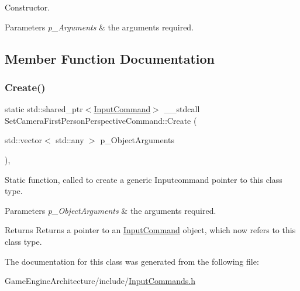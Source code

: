 Constructor. 


\begin{DoxyParams}{Parameters}
{\em p\+\_\+\+Arguments} & the arguments required. \\
\hline
\end{DoxyParams}


\subsection{Member Function Documentation}
\mbox{\label{class_set_camera_first_person_perspective_command_aa8b50b18b466a0577410cd19c87abd23}} 
\subsubsection{\texorpdfstring{Create()}{Create()}}
{\footnotesize\ttfamily static std\+::shared\+\_\+ptr$<$\mbox{\hyperlink{class_input_command}{Input\+Command}}$>$ \+\_\+\+\_\+stdcall Set\+Camera\+First\+Person\+Perspective\+Command\+::\+Create (\begin{DoxyParamCaption}\item[{std\+::vector$<$ std\+::any $>$}]{p\+\_\+\+Object\+Arguments }\end{DoxyParamCaption})\hspace{0.3cm}{\ttfamily [inline]}, {\ttfamily [static]}}



Static function, called to create a generic Inputcommand pointer to this class type. 


\begin{DoxyParams}{Parameters}
{\em p\+\_\+\+Object\+Arguments} & the arguments required. \\
\hline
\end{DoxyParams}
\begin{DoxyReturn}{Returns}
Returns a pointer to an \mbox{\hyperlink{class_input_command}{Input\+Command}} object, which now refers to this class type. 
\end{DoxyReturn}


The documentation for this class was generated from the following file\+:\begin{DoxyCompactItemize}
\item 
Game\+Engine\+Architecture/include/\mbox{\hyperlink{_input_commands_8h}{Input\+Commands.\+h}}\end{DoxyCompactItemize}
